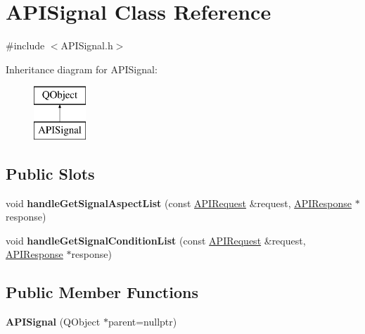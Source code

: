 \hypertarget{class_a_p_i_signal}{}\section{A\+P\+I\+Signal Class Reference}
\label{class_a_p_i_signal}


{\ttfamily \#include $<$A\+P\+I\+Signal.\+h$>$}

Inheritance diagram for A\+P\+I\+Signal\+:\begin{figure}[H]
\begin{center}
\leavevmode
\includegraphics[height=2.000000cm]{class_a_p_i_signal}
\end{center}
\end{figure}
\subsection*{Public Slots}
\begin{DoxyCompactItemize}
\item 
\mbox{\label{class_a_p_i_signal_aa39d78d40fce74c4adff19db446a34c8}} 
void {\bfseries handle\+Get\+Signal\+Aspect\+List} (const \hyperlink{class_a_p_i_request}{A\+P\+I\+Request} \&request, \hyperlink{class_a_p_i_response}{A\+P\+I\+Response} $\ast$response)
\item 
\mbox{\label{class_a_p_i_signal_a0d698251dabf70472533fa99e4f53e48}} 
void {\bfseries handle\+Get\+Signal\+Condition\+List} (const \hyperlink{class_a_p_i_request}{A\+P\+I\+Request} \&request, \hyperlink{class_a_p_i_response}{A\+P\+I\+Response} $\ast$response)
\end{DoxyCompactItemize}
\subsection*{Public Member Functions}
\begin{DoxyCompactItemize}
\item 
\mbox{\label{class_a_p_i_signal_ab712db36d6e6281b9b317d60295ca3f6}} 
{\bfseries A\+P\+I\+Signal} (Q\+Object $\ast$parent=nullptr)
\end{DoxyCompactItemize}


